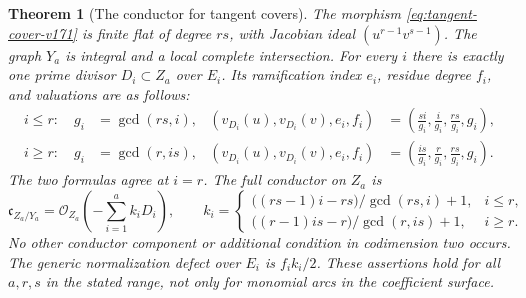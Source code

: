 \documentclass[11pt,reqno]{amsart}
\numberwithin{equation}{section}
\newtheorem{theorem}{Theorem}[section]
\theoremstyle{definition}\newtheorem{definition}[theorem]{Definition}
\theoremstyle{remark}\newtheorem{remark}[theorem]{Remark}
\newcommand{\OO}{\mathcal O}\newcommand{\II}{\mathcal I}
\begin{document}
\begin{theorem}[The conductor for tangent covers]
\label{thm:tangent-conductor-v171}
The morphism \eqref{eq:tangent-cover-v171} is finite flat of degree
$rs$, with Jacobian ideal $(u^{r-1}v^{s-1})$. The graph $Y_a$ is
integral and a local complete intersection. For every $i$ there is
exactly one prime divisor $D_i\subset Z_a$ over $E_i$. Its ramification
index $e_i$, residue degree $f_i$, and valuations are as follows:
\begin{align}
 i\leq r:\quad g_i&=\gcd(rs,i),&
 (v_{D_i}(u),v_{D_i}(v),e_i,f_i)
   &=\left(\frac{si}{g_i},\frac{i}{g_i},\frac{rs}{g_i},g_i\right),
 \label{eq:tangent-low-v171}\\
 i\geq r:\quad g_i&=\gcd(r,is),&
 (v_{D_i}(u),v_{D_i}(v),e_i,f_i)
   &=\left(\frac{is}{g_i},\frac{r}{g_i},\frac{rs}{g_i},g_i\right).
 \label{eq:tangent-high-v171}
\end{align}
The two formulas agree at $i=r$. The full conductor on $Z_a$ is
\begin{equation}\label{eq:tangent-conductor-v171}
 \mathfrak c_{Z_a/Y_a}=\OO_{Z_a}\left(-\sum_{i=1}^a k_iD_i\right),
 \qquad
 k_i=\begin{cases}
 \big((rs-1)i-rs\big)/\gcd(rs,i)+1,&i\leq r,\\
 \big((r-1)is-r\big)/\gcd(r,is)+1,&i\geq r.
 \end{cases}
\end{equation}
No other conductor component or additional condition in codimension
two occurs. The generic normalization defect over $E_i$ is $f_i k_i/2$.
These assertions hold for all $a,r,s$ in the stated range, not only for
monomial arcs in the coefficient surface.
\end{theorem}
\end{document}
